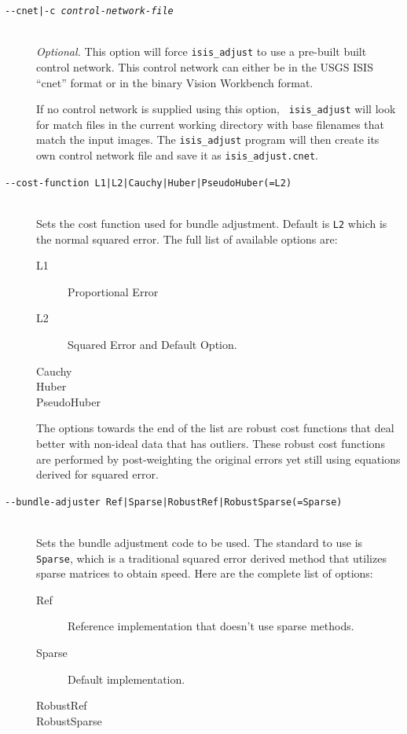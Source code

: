 \begin{description}

\item[\texttt{-\/-cnet|-c \textit{control-network-file}}] \hfill \\
  \emph{Optional.} This option will force {\tt isis\_adjust} to
  use a pre-built built control network. This control network can
  either be in the \ac{USGS} \ac{ISIS} ``cnet'' format or in the binary Vision
  Workbench format.

  If no control network is supplied using this option, {\tt
    isis\_adjust} will look for match files in the current working
  directory with base filenames that match the input images.  The
  \texttt{isis\_adjust} program will then create its own control
  network file and save it as \texttt{isis\_adjust.cnet}.

\item[\texttt{-\/-cost-function L1|L2|Cauchy|Huber|PseudoHuber(=L2)} ] \hfill \\
  Sets the cost function used for bundle adjustment. Default is \texttt{L2}
  which is the normal squared error. The full list of available options
  are:

  \begin{description}
    \item[L1] Proportional Error
    \item[L2] Squared Error and Default Option.
    \item[Cauchy]
    \item[Huber]
    \item[PseudoHuber]
  \end{description}

  The options towards the end of the list are robust cost functions
  that deal better with non-ideal data that has outliers. These robust
  cost functions are performed by post-weighting the original errors yet
  still using equations derived for squared error.

\item[\texttt{-\/-bundle-adjuster Ref|Sparse|RobustRef|RobustSparse(=Sparse)}] \hfill \\
  Sets the bundle adjustment code to be used. The standard to use is
  \texttt{Sparse}, which is a traditional squared error derived method that
  utilizes sparse matrices to obtain speed. Here are the complete list
  of options:

  \begin{description}
    \item[Ref] Reference implementation that doesn't use sparse methods.
    \item[Sparse] Default implementation.
    \item[RobustRef]
    \item[RobustSparse]
  \end{description}


\end{description}
